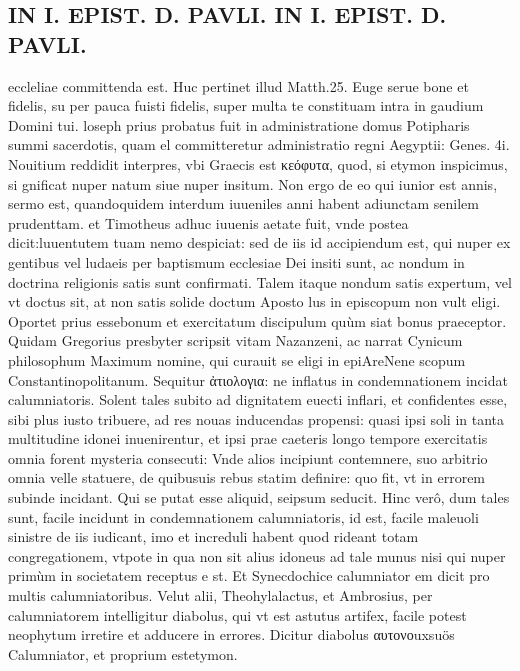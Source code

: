 \documentclass{article}
\begin{document}
\begin{pages}
\section*{IN I. EPIST. D. PAVLI. IN I. EPIST. D. PAVLI. }
\marginpar{[ p.80 ]}\pstart eccleliae committenda est. Huc pertinet illud Matth.25. Euge serue bone et fidelis, su per pauca fuisti fidelis, super multa te constituam intra in gaudium Domini tui. loseph prius probatus fuit in administratione domus Potipharis summi sacerdotis, quam el committeretur administratio regni Aegyptii: Genes. 4i.  \pend\pstart Nouitium reddidit interpres, vbi Graecis est κεόφυτα, quod, si etymon inspicimus, si gnificat nuper natum siue nuper insitum. Non ergo de eo qui iunior est annis, sermo est, quandoquidem interdum iuueniles anni habent adiunctam senilem prudenttam. et Timotheus adhuc iuuenis aetate fuit, vnde postea dicit:luuentutem tuam nemo despiciat: sed de iis id accipiendum est, qui nuper ex gentibus vel ludaeis per baptismum ecclesiae Dei insiti sunt, ac nondum in doctrina religionis satis sunt confirmati. Talem itaque nondum satis expertum, vel vt doctus sit, at non satis solide doctum Aposto lus in episcopum non vult eligi. Oportet prius essebonum et exercitatum discipulum quùm siat bonus praeceptor. Quidam Gregorius presbyter scripsit vitam Nazanzeni, ac narrat Cynicum philosophum Maximum nomine, qui curauit se eligi in epiAreNene scopum Constantinopolitanum. Sequitur ἀτιολογια: ne inflatus in condemnationem incidat calumniatoris. Solent tales subito ad dignitatem euecti inflari, et confidentes esse, sibi plus iusto tribuere, ad res nouas inducendas propensi: quasi ipsi soli in tanta multitudine idonei inuenirentur, et ipsi prae caeteris longo tempore exercitatis omnia forent mysteria consecuti: Vnde alios incipiunt contemnere, suo arbitrio omnia velle statuere, de quibusuis rebus statim definire: quo fit, vt in errorem subinde incidant. Qui se putat esse aliquid, seipsum seducit. Hinc verô, dum tales sunt, facile incidunt in condemnationem calumniatoris, id est, facile maleuoli sinistre de iis iudicant, imo et increduli habent quod rideant totam congregationem, vtpote in qua non sit alius idoneus ad tale munus nisi qui nuper primùm in societatem receptus e st. Et Synecdochice calumniator em dicit pro multis calumniatoribus. Velut alii, Theohylalactus, et Ambrosius, per calumniatorem intelligitur diabolus, qui vt est astutus artifex, facile potest neophytum irretire et adducere in errores. Dicitur diabolus αυτονοuxsuös Calumniator, et proprium estetymon.  \pend
{}
{}

\end{pages}
\end{document}
